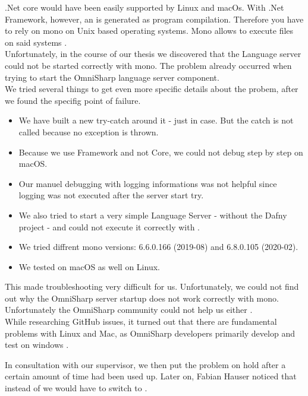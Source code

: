.Net core would have been easily supported by Linux and macOs.
With .Net Framework, however, an  is generated as program compilation.
Therefore you have to rely on mono on Unix based operating systems.
Mono allows to execute  files on said systems \cite{mono}. \\

Unfortunately, in the course of our thesis we discovered that the Language server could not be started correctly with mono.
The problem already occurred when trying to start the OmniSharp language server component. \\

We tried several things to get even more specific details about the probem, after we found the specifig point of failure.

\begin{itemize}
    \item We have built a new try-catch around it - just in case. But the catch is not called because no exception is thrown.
    \item Because we use Framework and not Core, we could not debug step by step on macOS.
    \item Our manuel debugging with logging informations was not helpful since logging was not executed after the server start try.
    \item We also tried to start a very simple Language Server - without the Dafny project - and could not execute it correctly with .
    \item We tried diffrent mono versions: 6.6.0.166 (2019-08) and 6.8.0.105 (2020-02).
    \item We tested on macOS as well on Linux.
\end{itemize}

This made troubleshooting very difficult for us.
Unfortunately, we could not find out why the OmniSharp server startup does not work correctly with mono.
Unfortunately the OmniSharp community could not help us either \cite{mono-slack}.\\

While researching GitHub issues, it turned out that there are fundamental problems with Linux and Mac, as OmniSharp developers primarily develop and test on windows \cite{mono-git}.

In consultation with our supervisor, we then put the problem on hold after a certain amount of time had been used up.
Later on, Fabian Hauser noticed that instead of  we would have to switch to .

